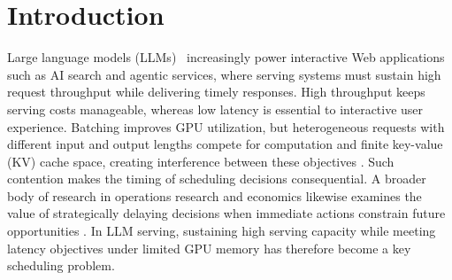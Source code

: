 \documentclass[sigconf,anonymous,review]{acmart}
\begin{document}
\maketitle

\section{Introduction}
\label{sec:introduction}


Large language models (LLMs)~\cite{openai2023gpt4,touvron2023llama2} increasingly power interactive Web applications such as AI search and agentic services, where serving systems must sustain high request throughput while delivering timely responses. High throughput keeps serving costs manageable, whereas low latency is essential to interactive user experience. Batching improves GPU utilization, but heterogeneous requests with different input and output lengths compete for computation and finite key-value (KV) cache space, creating interference between these objectives \cite{intro_vllm,intro_sarathi}. Such contention makes the timing of scheduling decisions consequential. 
A broader body of research in operations research and economics
likewise examines the value of strategically delaying decisions
when immediate actions constrain future opportunities
\cite{intro_baron2014,intro_akbarpour2020,intro_kerimov2024}.
 In LLM serving, sustaining high serving capacity while meeting latency objectives under limited GPU memory has therefore become a key scheduling problem.
\end{document}
